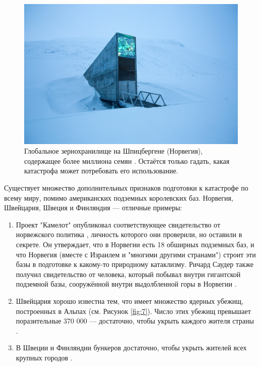 \documentclass[10pt,twocolumn,letterpaper]{article}
\begin{document}
\begin{figure}[t]
\begin{center}
   \includegraphics[width=1\linewidth]{svalbard.jpg}

\end{center}
   \caption{Глобальное зернохранилище на Шпицбергене (Норвегия), содержащее более миллиона семян \cite{24}. Остаётся только гадать, какая катастрофа может потребовать его использование.}
\label{fig:8}
\label{fig:onecol}
\end{figure}

Существует множество дополнительных признаков подготовки к катастрофе по всему миру, помимо американских подземных королевских баз. Норвегия, Швейцария, Швеция и Финляндия — отличные примеры:

\begin{flushleft}
\begin{enumerate}
    \item Проект "Камелот" опубликовал соответствующее свидетельство от норвежского политика \cite{25,26}, личность которого они проверили, но оставили в секрете. Он утверждает, что в Норвегии есть 18 обширных подземных баз, и что Норвегия (вместе с Израилем и "многими другими странами") строит эти базы в подготовке к какому-то природному катаклизму. Ричард Саудер также получил свидетельство от человека, который побывал внутри гигантской подземной базы, сооружённой внутри выдолбленной горы в Норвегии \cite{22}.
    \item Швейцария хорошо известна тем, что имеет множество ядерных убежищ, построенных в Альпах (см. Рисунок \ref{fig:7}). Число этих убежищ превышает поразительные 370 000 — достаточно, чтобы укрыть каждого жителя страны \cite{27}.
    \item В Швеции и Финляндии бункеров достаточно, чтобы укрыть жителей всех крупных городов \cite{27}. 
\end{enumerate}
\end{flushleft}
\end{document}
